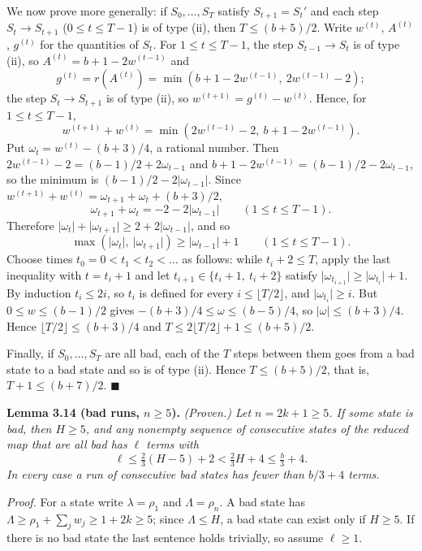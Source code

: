 \documentclass[11pt,letterpaper]{article}
\theoremstyle{paperstyle}
\theoremstyle{paperstyledef}
\theoremstyle{paperstylerem}
\begin{document}
We now prove more generally: if \(S_0, \dots, S_T\) satisfy \(S_{t+1} = S_t'\) and each step \(S_t \to S_{t+1}\) (\(0 \leq t \leq T-1\)) is of type (ii), then \(T \leq (b+5)/2\). Write \(w^{(t)}\), \(A^{(t)}\), \(g^{(t)}\) for the quantities of \(S_t\). For \(1 \leq t \leq T-1\), the step \(S_{t-1} \to S_t\) is of type (ii), so \(A^{(t)} = b + 1 - 2w^{(t-1)}\) and \[g^{(t)} = r(A^{(t)}) = \min(b + 1 - 2w^{(t-1)},\ 2w^{(t-1)} - 2);\] the step \(S_t \to S_{t+1}\) is of type (ii), so \(w^{(t+1)} = g^{(t)} - w^{(t)}\). Hence, for \(1 \leq t \leq T-1\), \[w^{(t+1)} + w^{(t)} = \min(2w^{(t-1)} - 2,\ b + 1 - 2w^{(t-1)}).\] Put \(\omega_t = w^{(t)} - (b+3)/4\), a rational number. Then \(2w^{(t-1)} - 2 = (b-1)/2 + 2\omega_{t-1}\) and \(b + 1 - 2w^{(t-1)} = (b-1)/2 - 2\omega_{t-1}\), so the minimum is \((b-1)/2 - 2\lvert \omega_{t-1} \rvert\). Since \(w^{(t+1)} + w^{(t)} = \omega_{t+1} + \omega_t + (b+3)/2\), \[\omega_{t+1} + \omega_t = -2 - 2\lvert \omega_{t-1} \rvert \qquad (1 \leq t \leq T-1).\] Therefore \(\lvert \omega_t \rvert + \lvert \omega_{t+1} \rvert \geq 2 + 2\lvert \omega_{t-1} \rvert\), and so \[\max(\lvert \omega_t \rvert,\ \lvert \omega_{t+1} \rvert) \geq \lvert \omega_{t-1} \rvert + 1 \qquad (1 \leq t \leq T-1).\] Choose times \(t_0 = 0 < t_1 < t_2 < \dots\) as follows: while \(t_i + 2 \leq T\), apply the last inequality with \(t = t_i + 1\) and let \(t_{i+1} \in \{t_i + 1,\ t_i + 2\}\) satisfy \(\lvert \omega_{t_{i+1}} \rvert \geq \lvert \omega_{t_i} \rvert + 1\). By induction \(t_i \leq 2i\), so \(t_i\) is defined for every \(i \leq \lfloor T/2 \rfloor\), and \(\lvert \omega_{t_i} \rvert \geq i\). But \(0 \leq w \leq (b-1)/2\) gives \(-(b+3)/4 \leq \omega \leq (b-5)/4\), so \(\lvert \omega \rvert \leq (b+3)/4\). Hence \(\lfloor T/2 \rfloor \leq (b+3)/4\) and \(T \leq 2\lfloor T/2 \rfloor + 1 \leq (b+5)/2\).

Finally, if \(S_0, \dots, S_T\) are all bad, each of the \(T\) steps between them goes from a bad state to a bad state and so is of type (ii). Hence \(T \leq (b+5)/2\), that is, \(T + 1 \leq (b+7)/2\). \(\blacksquare\)

\textbf{Lemma 3.14 (bad runs, \(n \geq 5\)).} \emph{(Proven.) Let \(n = 2k + 1 \geq 5\). If some state is bad, then \(H \geq 5\), and any nonempty sequence of consecutive states of the reduced map that are all bad has \(\ell\) terms with} \[\ell \leq \tfrac{2}{3}(H - 5) + 2 < \tfrac{2}{3}H + 4 \leq \tfrac{b}{3} + 4.\] \emph{In every case a run of consecutive bad states has fewer than \(b/3 + 4\) terms.}

\emph{Proof.} For a state write \(\lambda = \rho_1\) and \(\Lambda = \rho_n\). A bad state has \(\Lambda \geq \rho_1 + \sum_j w_j \geq 1 + 2k \geq 5\); since \(\Lambda \leq H\), a bad state can exist only if \(H \geq 5\). If there is no bad state the last sentence holds trivially, so assume \(\ell \geq 1\).
\end{document}
